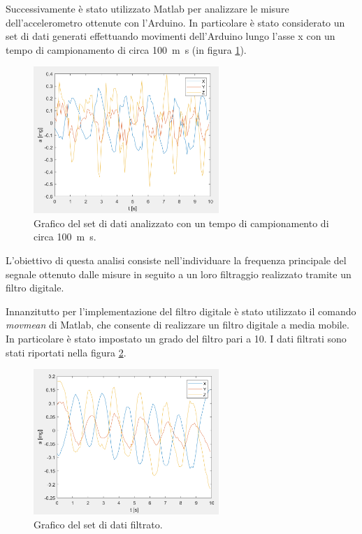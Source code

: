 Successivamente è stato utilizzato Matlab per analizzare le misure dell'accelerometro ottenute con l'Arduino. In particolare è stato considerato un set di dati generati effettuando movimenti dell'Arduino lungo l'asse x con un tempo di campionamento di circa \SI{100}{m\second} (in figura \ref{fig:plot_dati}).
\begin{figure}[tbh]
	\centering		\includegraphics[width=7cm]{./ImageFiles/plot1_arr2.png}
	\caption{Grafico del set di dati analizzato con un tempo di campionamento di circa \SI{100}{m\second}.}
	\label{fig:plot_dati}
\end{figure}

L'obiettivo di questa analisi consiste nell'individuare la frequenza principale del segnale ottenuto dalle misure in seguito a un loro filtraggio realizzato tramite un filtro digitale.

Innanzitutto per l'implementazione del filtro digitale è stato utilizzato il comando \textit{movmean} di Matlab, che consente di realizzare un filtro digitale a media mobile. In particolare è stato impostato un grado del filtro pari a 10. I dati filtrati sono stati riportati nella figura \ref{fig:plot_dati_filt}.
\begin{figure}[tbh]
	\centering		\includegraphics[width=7cm]{./ImageFiles/plot1filt_arr2.png}
	\caption{Grafico del set di dati filtrato.}
	\label{fig:plot_dati_filt}
\end{figure}

